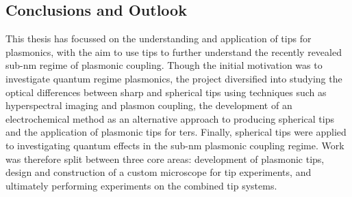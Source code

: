 \documentclass[12pt, a4paper, oneside]{book}
\begin{document}
\begin{singlespace}
\color{white}
\chapter{Conclusions and Outlook}
\end{singlespace}


This thesis has focussed on the understanding and application of tips for plasmonics, with the aim to use tips to further understand the recently revealed sub-nm regime of plasmonic coupling. Though the initial motivation was to investigate quantum regime plasmonics, the project diversified into studying the optical differences between sharp and spherical tips using techniques such as hyperspectral imaging and plasmon coupling, the development of an electrochemical method as an alternative approach to producing spherical tips and the application of plasmonic tips for \gls{ters}. Finally, spherical tips were applied to investigating quantum effects in the sub-nm plasmonic coupling regime. Work was therefore split between three core areas: development of plasmonic tips, design and construction of a custom microscope for tip experiments, and ultimately performing experiments on the combined tip systems.
\end{document}
